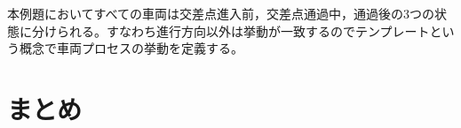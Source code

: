 \documentclass[10pt]{tpu-abst-utf}
\begin{document}
本例題においてすべての車両は交差点進入前，交差点通過中，通過後の3つの状態に分けられる。すなわち進行方向以外は挙動が一致するのでテンプレートという概念で車両プロセスの挙動を定義する。
\section{まとめ}



\begin{thebibliography}{1}
\end{thebibliography}
%
\end{document}

